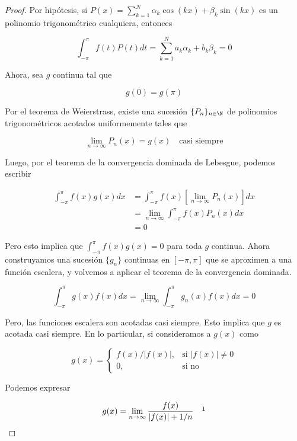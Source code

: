 \begin{proof}
    Por hipótesis, si $P(x) = \sum_{k = 1}^{N} \alpha_k\cos(kx) + \beta_k\sin(kx)$ es un polinomio trigonométrico cualquiera, entonces

    \[
        \int_{-\pi}^{\pi} f(t)P(t)dt = \sum_{k=1}^{N} a_k\alpha_k + b_k\beta_k = 0
    \]

    Ahora, sea $g$ continua tal que

    \[
        g(0) = g(\pi)
    \]

    Por el teorema de Weierstrass, existe una sucesión $\{P_n\}_{n \in \N}$ de polinomios trigonométricos acotados uniformemente tales que

    \[
        \lim_{n \to \infty} P_n(x) = g(x) \quad \text{casi siempre}
    \]

    Luego, por el teorema de la convergencia dominada de Lebesgue, podemos escribir

    \begin{equation*}
        \begin{split}
            \int_{-\pi}^{\pi} f(x)g(x)dx &= \int_{-\pi}^{\pi} f(x) \left[ \lim_{n \to \infty} P_n(x) \right] dx \\
            &= \lim_{n \to \infty} \int_{-\pi}^{\pi} f(x)P_n(x) dx \\
            &= 0
        \end{split}
    \end{equation*}

    Pero esto implica que $\int_{-\pi}^{\pi} f(x)g(x) = 0$ para toda $g$ continua. Ahora construyamos una sucesión $\{g_n\}$ continuas en $[-\pi, \pi]$ que se aproximen a una función escalera, y volvemos a aplicar el teorema de la convergencia dominada.

    \[
        \int_{-\pi}^{\pi} g(x)f(x)dx = \lim_{n \to \infty} \int_{-\pi}^{\pi} g_n(x)f(x)dx = 0
    \]

    Pero, las funciones escalera son acotadas casi siempre. Esto implica que $g$ es acotada casi siempre. En lo particular, si consideramos a $g(x)$ como

    \[
        g(x) = \begin{cases}
            f(x) / |f(x)|, &\text{si } |f(x)| \neq 0 \\
            0, &\text{si no}
        \end{cases}
    \]

    Podemos expresar

    \[
        g(x) = \lim_{n \to \infty} \frac{f(x)}{|f(x)| + 1/n} \quad \footnotemark
    \]
\end{proof}
